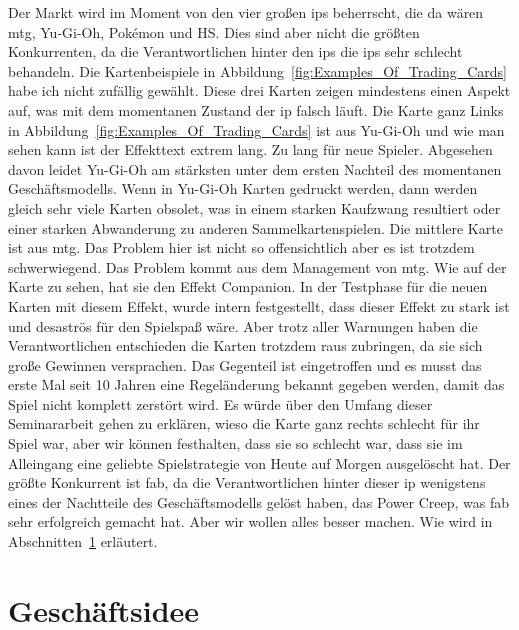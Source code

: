 \documentclass[fontsize=12, a4aper]{scrartcl}
\begin{document}
\noindent Der Markt wird im Moment von den vier großen \acp{ip} beherrscht, die da wären \acl{mtg}, Yu-Gi-Oh, Pok\'emon und \acl{HS}. Dies sind aber nicht die größten Konkurrenten, da die Verantwortlichen hinter den \acp{ip} die \acp{ip} sehr schlecht behandeln. Die Kartenbeispiele in Abbildung~\ref{fig:Examples_Of_Trading_Cards} habe ich nicht zufällig gewählt. Diese drei Karten zeigen mindestens einen Aspekt auf, was mit dem momentanen Zustand der \acl{ip} falsch läuft. Die Karte ganz Links in Abbildung~\ref{fig:Examples_Of_Trading_Cards} ist aus Yu-Gi-Oh und wie man sehen kann ist der Effekttext extrem lang. Zu lang für neue Spieler. Abgesehen davon leidet Yu-Gi-Oh am stärksten unter dem ersten Nachteil des momentanen Geschäftsmodells. Wenn in Yu-Gi-Oh Karten gedruckt werden, dann werden gleich sehr viele Karten obsolet, was in einem starken Kaufzwang resultiert oder einer starken Abwanderung zu anderen Sammelkartenspielen. Die mittlere Karte ist aus \acl{mtg}. Das Problem hier ist nicht so offensichtlich aber es ist trotzdem schwerwiegend. Das Problem kommt aus dem Management von \ac{mtg}. Wie auf der Karte zu sehen, hat sie den Effekt \glqq Companion\grqq. In der Testphase für die neuen Karten mit diesem Effekt, wurde intern festgestellt, dass dieser Effekt zu stark ist und desaströs für den Spielspaß wäre. Aber trotz aller Warnungen haben die Verantwortlichen entschieden die Karten trotzdem raus zubringen, da sie sich große Gewinnen versprachen. Das Gegenteil ist eingetroffen und es musst das erste Mal seit 10 Jahren eine Regeländerung bekannt gegeben werden, damit das Spiel nicht komplett zerstört wird. Es würde über den Umfang dieser Seminararbeit gehen zu erklären, wieso die Karte ganz rechts schlecht für ihr Spiel war, aber wir können festhalten, dass sie so schlecht war, dass sie im Alleingang eine geliebte Spielstrategie von Heute auf Morgen ausgelöscht hat. Der größte Konkurrent ist \acl{fab}, da die Verantwortlichen hinter dieser \ac{ip} wenigstens eines der Nachtteile des Geschäftsmodells gelöst haben, das \glqq Power Creep\grqq, was \ac{fab} sehr erfolgreich gemacht hat. Aber wir wollen alles besser machen. Wie wird in Abschnitten~\ref{sec:Geschaeftidee} erläutert.


\section{Geschäftsidee} \label{sec:Geschaeftidee}
\end{document}
